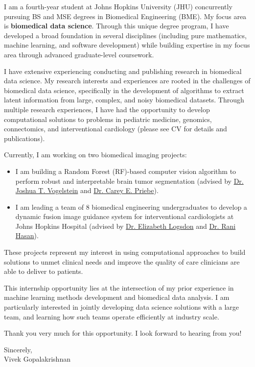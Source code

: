 \documentclass[11pt, letterpaper, sans, citecolor=blue, colorlinks=true, urlcolor=blue]{moderncv}
\begin{document}
\makecvtitle
\vspace*{-1.5\baselineskip}
I am a fourth-year student at Johns Hopkins University (JHU) concurrently pursuing BS and MSE degrees in Biomedical Engineering (BME). My focus area is \textbf{biomedical data science}. Through this unique degree program, I have developed a broad foundation in several disciplines (including pure mathematics, machine learning, and software development) while building expertise in my focus area through advanced graduate-level coursework. 

\vspace{1em}
I have extensive experiencing conducting and publishing research in biomedical data science.
My research interests and experiences are rooted in the challenges of biomedical data science, specifically in the development of algorithms to extract latent information from large, complex, and noisy biomedical datasets. Through multiple research experiences, I have had the opportunity to develop computational solutions to problems in pediatric medicine, genomics, connectomics, and interventional cardiology (please see CV for details and publications).

\vspace{1em}
Currently, I am working on two biomedical imaging projects:
\begin{itemize}
    \item I am building a Random Forest (RF)-based computer vision algorithm to perform robust and interpretable brain tumor segmentation (advised by \href{https://jovo.me}{Dr. Joshua T. Vogelstein} and \href{https://www.ams.jhu.edu/~priebe/}{Dr. Carey E. Priebe}).
    \item I am leading a team of 8 biomedical engineering undergraduates to develop a dynamic fusion image guidance system for interventional cardiologists at Johns Hopkins Hospital (advised by \href{https://www.bme.jhu.edu/faculty_staff/elizabeth-logsdon-phd/}{Dr. Elizabeth Logsdon} and \href{https://www.hopkinsmedicine.org/profiles/results/directory/profile/1571333/rani-hasan}{Dr. Rani Hasan}). 
\end{itemize}
These projects represent my interest in using computational approaches to build solutions to unmet clinical needs and improve the quality of care clinicians are able to deliver to patients.

\vspace{1em}
This internship opportunity lies at the intersection of my prior experience in machine learning methods development and biomedical data analysis. 
I am particularly interested in jointly developing data science solutions with a large team, and learning how such teams operate efficiently at industry scale.

\vspace{1em}
Thank you very much for this opportunity.
I look forward to hearing from you!

\vspace{1em}
\setlength{\parindent}{50ex}
Sincerely,\\[2.5em]

Vivek Gopalakrishnan
\end{document}

